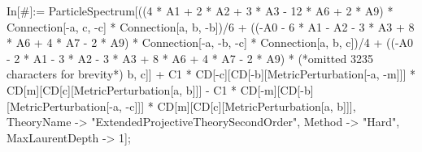 In[#]:= ParticleSpectrum[((4 * A1 + 2 * A2 + 3 * A3 - 12 * A6 + 2 * A9) * Connection[-a, c, -c] * Connection[a, b, -b])/6 + ((-A0 - 6 * A1 - A2 - 3 * A3 + 8 * A6 + 4 * A7 - 2 * A9) * Connection[-a, -b, -c] * Connection[a, b, c])/4 + ((-A0 - 2 * A1 - 3 * A2 - 3 * A3 + 8 * A6 + 4 * A7 - 2 * A9) * (*omitted 3235 characters for brevity*) b, c]] + C1 * CD[-c][CD[-b][MetricPerturbation[-a, -m]]] * CD[m][CD[c][MetricPerturbation[a, b]]] - C1 * CD[-m][CD[-b][MetricPerturbation[-a, -c]]] * CD[m][CD[c][MetricPerturbation[a, b]]], TheoryName -> "ExtendedProjectiveTheorySecondOrder", Method -> "Hard", MaxLaurentDepth -> 1];
